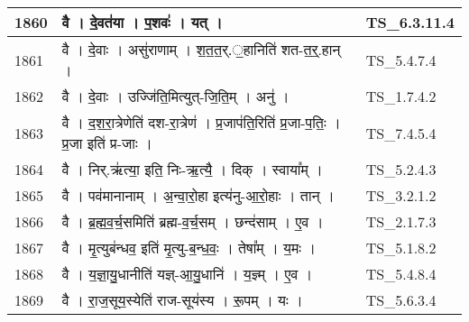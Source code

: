 \documentclass[17pt]{extarticle}
\begin{document}
\begin{longtable}{||p{0.4in}||p{4.9in}||p{0.9in}||}
    \hline
        
    1860 & वै   ।   दे॒वत॑या   ।   प॒शवः॑   ।   यत्   ।    & TS\_6.3.11.4       \\
    
    \hline
        
    1861 & वै   ।   दे॒वाः   ।   असु॑राणाम्   ।   श॒त॒त॒र्.॒हानिति॑ शत{-}त॒र्॒.हान्   ।    & TS\_5.4.7.4       \\
    
    \hline
        
    1862 & वै   ।   दे॒वाः   ।   उज्जि॑ति॒मित्युत्{-}जि॒ति॒म्   ।   अनु॑   ।    & TS\_1.7.4.2       \\
    
    \hline
        
    1863 & वै   ।   द॒श॒रा॒त्रेणेति॑ दश{-}रा॒त्रेण॑   ।   प्र॒जाप॑ति॒रिति॑ प्र॒जा{-}प॒तिः॒   ।   प्र॒जा इति॑ प्र{-}जाः   ।    & TS\_7.4.5.4       \\
    
    \hline
        
    1864 & वै   ।   निर्.ऋ॑त्या॒ इति॒ निः{-}ऋ॒त्यै॒   ।   दिक्   ।   स्वाया᳚म्   ।    & TS\_5.2.4.3       \\
    
    \hline
        
    1865 & वै   ।   पव॑मानानाम्   ।   अ॒न्वा॒रो॒हा इत्य॑नु{-}आ॒रो॒हाः   ।   तान्   ।    & TS\_3.2.1.2       \\
    
    \hline
        
    1866 & वै   ।   ब्र॒ह्म॒व॒र्च॒समिति॑ ब्रह्म{-}व॒र्च॒सम्   ।   छन्द॑साम्   ।   ए॒व   ।    & TS\_2.1.7.3       \\
    
    \hline
        
    1867 & वै   ।   मृ॒त्युब॑न्धव॒ इति॑ मृ॒त्यु{-}ब॒न्ध॒वः॒   ।   तेषा᳚म्   ।   य॒मः   ।    & TS\_5.1.8.2       \\
    
    \hline
        
    1868 & वै   ।   य॒ज्ञा॒यु॒धानीति॑ यज्ञ्{-}आ॒यु॒धानि॑   ।   य॒ज्ञ्म्   ।   ए॒व   ।    & TS\_5.4.8.4       \\
    
    \hline
        
    1869 & वै   ।   रा॒ज॒सूय॒स्येति॑ राज{-}सूय॑स्य   ।   रू॒पम्   ।   यः   ।    & TS\_5.6.3.4       \\
    
    \hline
        

\end{longtable}
\end{document}
